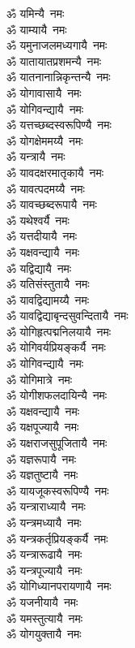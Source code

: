 \begin{flushleft}
\begin{multicols}{2}
ॐ यमिन्यै~नमः\\
ॐ याम्यायै~नमः\hfill{}\\
ॐ यमुनाजलमध्यगायै~नमः\\
ॐ यातायातप्रशमन्यै~नमः\\
ॐ यातनानान्निकृन्तन्यै~नमः\\
ॐ योगावासायै~नमः\\
ॐ योगिवन्द्यायै~नमः\\
ॐ यत्तच्छब्दस्वरूपिण्यै~नमः\\
ॐ योगक्षेममय्यै~नमः\\
ॐ यन्त्रायै~नमः\\
ॐ यावदक्षरमातृकायै~नमः\\
ॐ यावत्पदमय्यै~नमः\hfill{}\\
ॐ यावच्छब्दरूपायै~नमः\\
ॐ यथेश्वर्यै~नमः\\
ॐ यत्तदीयायै~नमः\\
ॐ यक्षवन्द्यायै~नमः\\
ॐ यद्विद्यायै~नमः\\
ॐ यतिसंस्तुतायै~नमः\\
ॐ यावद्विद्यामय्यै~नमः\\
ॐ यावद्विद्याबृन्दसुवन्दितायै~नमः\\
ॐ योगिहृत्पद्मनिलयायै~नमः\\
ॐ योगिवर्यप्रियङ्कर्यै~नमः\hfill{}\\
ॐ योगिवन्द्यायै~नमः\\
ॐ योगिमात्रे~नमः\\
ॐ योगीशफलदायिन्यै~नमः\\
ॐ यक्षवन्द्यायै~नमः\\
ॐ यक्षपूज्यायै~नमः\\
ॐ यक्षराजसुपूजितायै~नमः\\
ॐ यज्ञरूपायै~नमः\\
ॐ यज्ञतुष्टायै~नमः\\
ॐ यायजूकस्वरूपिण्यै~नमः\\
ॐ यन्त्राराध्यायै~नमः\hfill{}\\
ॐ यन्त्रमध्यायै~नमः\\
ॐ यन्त्रकर्तृप्रियङ्कर्यै~नमः\\
ॐ यन्त्रारूढायै~नमः\\
ॐ यन्त्रपूज्यायै~नमः\\
ॐ योगिध्यानपरायणायै~नमः\\
ॐ यजनीयायै~नमः\\
ॐ यमस्तुत्यायै~नमः\\
ॐ योगयुक्तायै~नमः\\

\end{multicols}
\end{flushleft}
